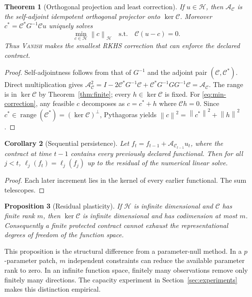 \documentclass{vanish_ieee}
\newtheorem{theorem}{Theorem}
\newtheorem{proposition}[theorem]{Proposition}
\newtheorem{corollary}[theorem]{Corollary}
\theoremstyle{definition}
\newcommand{\Hcal}{\mathcal{H}}
\newcommand{\Aop}{\mathcal{A}}
\newcommand{\Cop}{\mathcal{C}}
\newcommand{\norm}[1]{\left\lVert#1\right\rVert}
\newcommand{\VANISH}{\textsc{Vanish}}
\begin{document}
\begin{theorem}[Orthogonal projection and least correction]
If $u\in\Hcal$, then $\Aop_{\Cop}$ is the self-adjoint idempotent orthogonal projector onto $\ker\Cop$.  Moreover $c^*=\Cop^*G^{-1}\Cop u$ uniquely solves
\begin{equation}
\min_{c\in\Hcal}\norm{c}_{\Hcal}
\quad\text{s.t.}\quad \Cop(u-c)=0.
\label{eq:min-correction}
\end{equation}
Thus \VANISH{} makes the smallest RKHS correction that can enforce the declared contract.
\label{thm:projection}
\end{theorem}
\begin{proof}
Self-adjointness follows from that of $G^{-1}$ and the adjoint pair $(\Cop,\Cop^*)$.  Direct multiplication gives
$\Aop_{\Cop}^2=I-2\Cop^*G^{-1}\Cop+\Cop^*G^{-1}GG^{-1}\Cop=\Aop_{\Cop}$.
The range is in $\ker\Cop$ by Theorem~\ref{thm:finite}; every $h\in\ker\Cop$ is fixed.  For \eqref{eq:min-correction}, any feasible $c$ decomposes as $c=c^*+h$ where $\Cop h=0$.  Since $c^*\in\operatorname{range}(\Cop^*)=(\ker\Cop)^\perp$, Pythagoras yields $\norm{c}^2=\norm{c^*}^2+\norm{h}^2$.
\end{proof}

\begin{corollary}[Sequential persistence]
Let $f_t=f_{t-1}+\Aop_{\Cop_{t-1}}u_t$, where the contract at time $t-1$ contains every previously declared functional.  Then for all $j<t$,
$\ell_j(f_t)=\ell_j(f_j)$ up to the residual of the numerical linear solve.
\end{corollary}
\begin{proof}
Each later increment lies in the kernel of every earlier functional.  The sum telescopes.
\end{proof}

\begin{proposition}[Residual plasticity]
If $\Hcal$ is infinite dimensional and $\Cop$ has finite rank $m$, then $\ker\Cop$ is infinite dimensional and has codimension at most $m$.  Consequently a finite protected contract cannot exhaust the representational degrees of freedom of the function space.
\label{prop:plasticity}
\end{proposition}
This proposition is the structural difference from a parameter-null method.  In a $p$-parameter patch, $m$ independent constraints can reduce the available parameter rank to zero.  In an infinite function space, finitely many observations remove only finitely many directions.  The capacity experiment in Section~\ref{sec:experiments} makes this distinction empirical.
\end{document}
